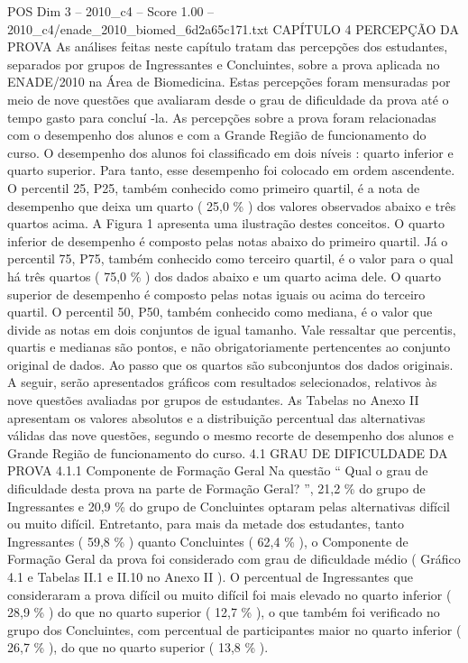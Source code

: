 \begin{textsample}{POS Dim 3 – 2010\_c4 – Score 1.00 – 2010\_c4/enade\_2010\_biomed\_6d2a65c171.txt}  \label{ex:f3_pos_143}
CAPÍTULO 4 PERCEPÇÃO DA PROVA As análises feitas neste capítulo tratam das percepções dos estudantes, separados por grupos de Ingressantes e Concluintes, sobre a prova aplicada no ENADE/2010 na Área de Biomedicina.
Estas percepções foram mensuradas por meio de nove questões que avaliaram desde o grau de dificuldade da prova até o tempo gasto para concluí -la.
As percepções sobre a prova foram relacionadas com o desempenho dos alunos e com a Grande Região de funcionamento do curso.
O desempenho dos alunos foi classificado em dois níveis : quarto inferior e quarto superior.
Para tanto, esse desempenho foi colocado em ordem ascendente.
O percentil 25, P25, também conhecido como primeiro quartil, é a nota de desempenho que deixa um quarto ( 25,0 \% ) dos valores observados abaixo e três quartos acima.
A Figura 1 apresenta uma ilustração destes conceitos.
O quarto inferior de desempenho é composto pelas notas abaixo do primeiro quartil.
Já o percentil 75, P75, também conhecido como terceiro quartil, é o valor para o qual há três quartos ( 75,0 \% ) dos dados abaixo e um quarto acima dele.
O quarto superior de desempenho é composto pelas notas iguais ou acima do terceiro quartil.
O percentil 50, P50, também conhecido como mediana, é o valor que divide as notas em dois conjuntos de igual tamanho.
Vale ressaltar que percentis, quartis e medianas são pontos, e não obrigatoriamente pertencentes ao conjunto original de dados.
Ao passo que os quartos são subconjuntos dos dados originais.
A seguir, serão apresentados gráficos com resultados selecionados, relativos às nove questões avaliadas por grupos de estudantes.
As Tabelas no Anexo II apresentam os valores absolutos e a distribuição percentual das alternativas válidas das nove questões, segundo o mesmo recorte de desempenho dos alunos e Grande Região de funcionamento do curso. 4.1 GRAU DE DIFICULDADE DA PROVA 4.1.1 Componente de Formação Geral Na questão “ Qual o grau de dificuldade desta prova na parte de Formação Geral? ”, 21,2 \% do grupo de Ingressantes e 20,9 \% do grupo de Concluintes optaram pelas alternativas difícil ou muito difícil.
Entretanto, para mais da metade dos estudantes, tanto Ingressantes ( 59,8 \% ) quanto Concluintes ( 62,4 \% ), o Componente de Formação Geral da prova foi considerado com grau de dificuldade médio ( Gráfico 4.1 e Tabelas II.1 e II.10 no Anexo II ).
O percentual de Ingressantes que consideraram a prova difícil ou muito difícil foi mais elevado no quarto inferior ( 28,9 \% ) do que no quarto superior ( 12,7 \% ), o que também foi verificado no grupo dos Concluintes, com percentual de participantes maior no quarto inferior ( 26,7 \% ), do que no quarto superior ( 13,8 \% ).

\end{textsample}

